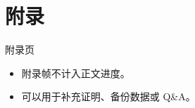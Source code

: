\appendix
\section{附录}

\begin{frame}{附录页}
  \begin{itemize}
    \item 附录帧不计入正文进度。
    \item 可以用于补充证明、备份数据或 Q\&A。
  \end{itemize}
\end{frame}

\cxQAFrame
